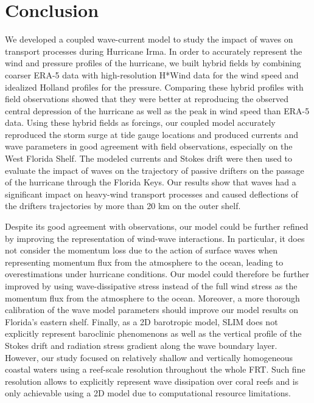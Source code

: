 \documentclass[preprint,12pt,authoryear]{elsarticle}
\begin{document}
\section{Conclusion}

We developed a coupled wave-current model to study the impact of waves on transport processes during Hurricane Irma. In order to accurately represent the wind and pressure profiles of the hurricane, we built hybrid fields by combining coarser ERA-5 data with high-resolution H*Wind data for the wind speed and idealized Holland profiles for the pressure. Comparing these hybrid profiles with field observations showed that they were better at reproducing the observed central depression of the hurricane as well as the peak in wind speed than ERA-5 data. Using these hybrid fields as forcings, our coupled model accurately reproduced the storm surge at tide gauge locations and produced currents and wave parameters in good agreement with field observations, especially on the West Florida Shelf. The modeled currents and Stokes drift were then used to evaluate the impact of waves on the trajectory of passive drifters on the passage of the hurricane through the Florida Keys. Our results show that waves had a significant impact on heavy-wind transport processes and caused deflections of the drifters trajectories by more than 20 km on the outer shelf.

Despite its good agreement with observations, our model could be further refined by improving the representation of wind-wave interactions. In particular, it does not consider the momentum loss due to the action of surface waves when representing momentum flux from the atmosphere to the ocean, leading to overestimations under hurricane conditions. Our model could therefore be further improved by using wave-dissipative stress instead of the full wind stress as the momentum flux from the atmosphere to the ocean. Moreover, a more thorough calibration of the wave model parameters should improve our model results on Florida's eastern shelf. Finally, as a 2D barotropic model, SLIM does not explicitly represent baroclinic phenomenons as well as the vertical profile of the Stokes drift and radiation stress gradient along the wave boundary layer. However, our study focused on relatively shallow and vertically homogeneous coastal waters using a reef-scale resolution throughout the whole FRT. Such fine resolution allows to explicitly represent wave dissipation over coral reefs and is only achievable using a 2D model due to computational resource limitations.
\end{document}
